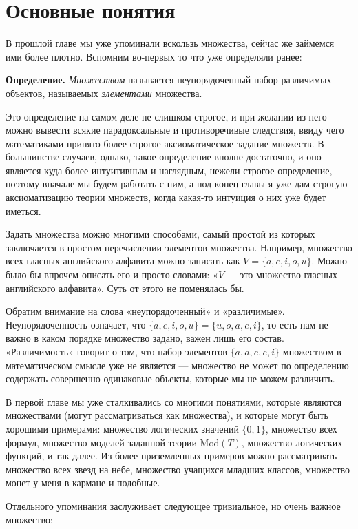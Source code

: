 \section{Основные понятия}

В прошлой главе мы уже упоминали вскользь множества, сейчас же займемся ими более плотно. Вспомним во-первых то что уже определяли ранее:

{\bfseries Определение.} {\slshape Множеством} называется неупорядоченный набор различимых объектов, называемых {\slshape элементами} множества.

Это определение на самом деле не слишком строгое, и при желании из него можно вывести всякие парадоксальные и противоречивые следствия, ввиду чего математиками принято более строгое аксиоматическое задание множеств. В большинстве случаев, однако, такое определение вполне достаточно, и оно является куда более интуитивным и наглядным, нежели строгое определение, поэтому вначале мы будем работать с ним, а под конец главы я уже дам строгую аксиоматизацию теории множеств, когда какая-то интуиция о них уже будет иметься.

Задать множества можно многими способами, самый простой из которых заключается в простом перечислении элементов множества. Например, множество всех гласных английского алфавита можно записать как $V = \{a, e, i, o, u\}$. Можно было бы впрочем описать его и просто словами: «$V$ — это множество гласных английского алфавита». Суть от этого не поменялась бы.

Обратим внимание на слова «неупорядоченный» и «различимые». Неупорядоченность означает, что $\{a, e, i, o, u\} = \{u, o, a, e, i\}$, то есть нам не важно в каком порядке множество задано, важен лишь его состав. «Различимость» говорит о том, что набор элементов $\{a, a, e, e, i\}$ множеством в математическом смысле уже не является — множество не может по определению содержать совершенно одинаковые объекты, которые мы не можем различить.

В первой главе мы уже сталкивались со многими понятиями, которые являются множествами (могут рассматриваться как множества), и которые могут быть хорошими примерами: множество логических значений $\{0, 1\}$, множество всех формул, множество моделей заданной теории $\mathrm{Mod}(T)$, множество логических функций, и так далее. Из более приземленных примеров можно рассматривать множество всех звезд на небе, множество учащихся младших классов, множество монет у меня в кармане и подобные.

Отдельного упоминания заслуживает следующее тривиальное, но очень важное множество:

